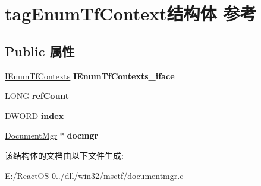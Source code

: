 \hypertarget{structtag_enum_tf_context}{}\section{tag\+Enum\+Tf\+Context结构体 参考}
\label{structtag_enum_tf_context}
\subsection*{Public 属性}
\begin{DoxyCompactItemize}
\item 
\mbox{\label{structtag_enum_tf_context_a241eafbc73a7c8afd365362dc4c44d79}} 
\hyperlink{interface_i_enum_tf_contexts}{I\+Enum\+Tf\+Contexts} {\bfseries I\+Enum\+Tf\+Contexts\+\_\+iface}
\item 
\mbox{\label{structtag_enum_tf_context_a527c144f024da233887cfa5d505d6ab1}} 
L\+O\+NG {\bfseries ref\+Count}
\item 
\mbox{\label{structtag_enum_tf_context_a523b323a250b1731a144199f0183fdcb}} 
D\+W\+O\+RD {\bfseries index}
\item 
\mbox{\label{structtag_enum_tf_context_a30275f51939a104b63ab0efea8b53da2}} 
\hyperlink{structtag_document_mgr}{Document\+Mgr} $\ast$ {\bfseries docmgr}
\end{DoxyCompactItemize}


该结构体的文档由以下文件生成\+:\begin{DoxyCompactItemize}
\item 
E\+:/\+React\+O\+S-\/0../dll/win32/msctf/documentmgr.\+c\end{DoxyCompactItemize}
